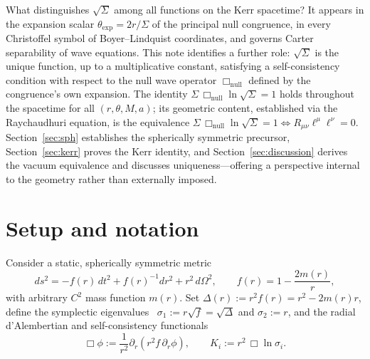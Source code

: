 \documentclass{iopart}
\begin{document}
What distinguishes $\sqrt{\Sigma}$ among all functions on the Kerr
spacetime?
It appears in the expansion scalar
$\theta_{\mathrm{exp}}=2r/\Sigma$ of the principal null congruence,
in every Christoffel symbol of Boyer--Lindquist coordinates, and
governs Carter separability of wave equations.
This note identifies a further role: $\sqrt{\Sigma}$ is the unique
function, up to a multiplicative constant, satisfying a
self-consistency condition with respect to the null wave operator
$\Box_{\mathrm{null}}$ defined by the congruence's own expansion.
The identity $\Sigma\,\Box_{\mathrm{null}}\ln\sqrt{\Sigma}=1$ holds
throughout the spacetime for all $(r,\theta,M,a)$; its geometric
content, established via the Raychaudhuri equation, is the
equivalence $\Sigma\,\Box_{\mathrm{null}}\ln\sqrt{\Sigma}=1
\Leftrightarrow R_{\mu\nu}\ell^\mu\ell^\nu=0$.
Section~\ref{sec:sph} establishes the spherically symmetric
precursor, Section~\ref{sec:kerr} proves the Kerr identity, and
Section~\ref{sec:discussion} derives the vacuum equivalence and
discusses uniqueness---offering a perspective internal to the
geometry rather than externally imposed.


\section{Setup and notation}

Consider a static, spherically symmetric metric
\begin{equation}\label{eq:metric}
  ds^2 = -f(r)\,dt^2 + f(r)^{-1}dr^2 + r^2\,d\Omega^2,
  \qquad f(r)=1-\frac{2m(r)}{r},
\end{equation}
with arbitrary $C^2$ mass function $m(r)$.
Set $\Delta(r):=r^2 f(r)=r^2-2m(r)r$, define the symplectic
eigenvalues~\cite{K1} $\sigma_1:=r\sqrt{f}=\sqrt{\Delta}$ and $\sigma_2:=r$,
and the radial d'Alembertian and self-consistency functionals
\begin{equation}
  \Box\phi:=\frac{1}{r^2}\partial_r(r^2 f\,\partial_r\phi),
  \qquad
  K_i:=r^2\,\Box\ln\sigma_i.
\end{equation}
\end{document}
